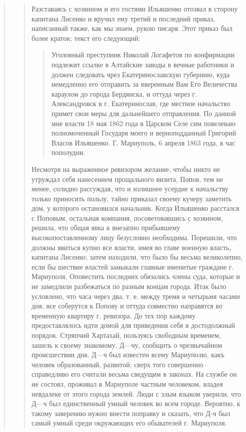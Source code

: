 \begin{quote}
\begin{quote}
Разставаясь с хозяином и его гостями Ильяшенко
отозвал в сторону капитана Лисенко и вручил ему третий
и последний приказ, написанный также, как мы знаем,
рукою писаря. Этот приказ был более краток; текст
его следующий: 

\begin{quote}
\em\bfseries
	
Уголовный преступник Николай Логафетов по конфирмации подлежит ссылке в
Алтайские заводы в вечные работники и должен следовать чрез
Екатеринославскую губернию, куда немедленно его отправить за вверенным
Вам Его Величества караулом до города Бердянска, и оттуда через г.
Александровск в г. Екатеринослав, где местное начальство примет свои
меры для дальнейшего отправления. По данной мне власти 18 мая 1862 года
в Царском Селе сим повелеваю полномоченный Государя моего и
верноподданный Григорий Власов Ильяшенко. Г. Мариуполь, 6 апреля 1863
года, в час пополудни.

\end{quote}

Несмотря на выраженное ревизором желание, чтобы
никто не утруждал себя нанесением прощального визита,
Попов, тем не менее, солидно рассуждая, что и излишнее
усердие к начальству только приносить пользу, тайно приказал 
своему кучеру заметить дом, у которого остановился
начальник. Когда Ильяшенко расстался с Поповым, остальная компания, 
посоветовавшись с хозяином, решила, что
общая явка к внезапно прибывшему высокопоставленному
лицу безусловно необходима. Порешили, что должны явиться
купно все власти, имея во главе военную власть, капитана
Лисенко; затем находили, что было бы весьма великолепно,
если бы шествие властей замыкали главные именитые
граждане г. Мариуполя. Оповестить последних обязались
члены суда, которые и не замедлили разбежаться по разным концам города. Итак
было условлено, что часа через два, т. е. между тремя и четырьмя часами дня,
все соберутся к Попову и оттуда совместно направятся во временную квартиру г.
ревизора. До тех пор каждому предоставлялось идти домой
для приведения себя в достодолжный порядок. Стряпчий Хартахай, пользуясь
свободным временем, зашель к своему знакомому, Д—чу, сообщить о чрезвычайном
происшествии дня. Д—ч был известен всему Мариуполю, какъ человек образованный,
развитой; сверх того совершенно справедливо его считали весьма сведущим в
законах.  На службе он не состоял, проживал в Мариуполе частным человеком,
владея невдалеке от этого города землей. Люди с злым языком уверили, что Д—ч
был единственный умный человек во всем городе. Вероятно, к такому заверению
нужно внести поправку и сказать, что Д-ч был самый умный среди окружающих его
обывателей г. Мариуполя.


\end{quote}
\end{quote}
